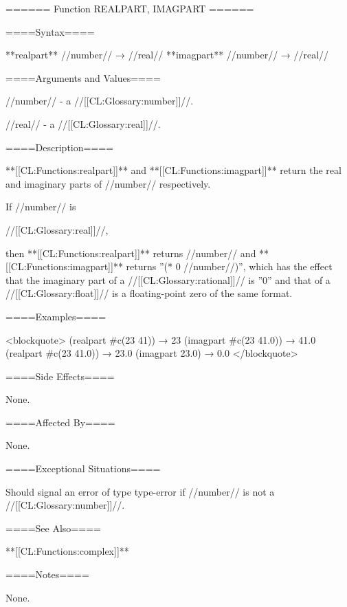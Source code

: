 ====== Function REALPART, IMAGPART ======

====Syntax====

**realpart** //number// → //real// **imagpart** //number// → //real//

====Arguments and Values====

//number// - a //[[CL:Glossary:number]]//.

//real// - a //[[CL:Glossary:real]]//.

====Description====

**[[CL:Functions:realpart]]** and **[[CL:Functions:imagpart]]** return the real and imaginary parts of //number// respectively.

If //number// is

//[[CL:Glossary:real]]//,

then **[[CL:Functions:realpart]]** returns //number// and **[[CL:Functions:imagpart]]** returns ''(* 0 //number//)'', which has the effect that the imaginary part of a //[[CL:Glossary:rational]]// is ''0'' and that of a //[[CL:Glossary:float]]// is a floating-point zero of the same format.

====Examples====

<blockquote> (realpart #c(23 41)) → 23 (imagpart #c(23 41.0)) → 41.0 (realpart #c(23 41.0)) → 23.0 (imagpart 23.0) → 0.0 </blockquote>

====Side Effects====

None.

====Affected By====

None.

====Exceptional Situations====

Should signal an error of type type-error if //number// is not a //[[CL:Glossary:number]]//.

====See Also====

**[[CL:Functions:complex]]**

====Notes====

None.

